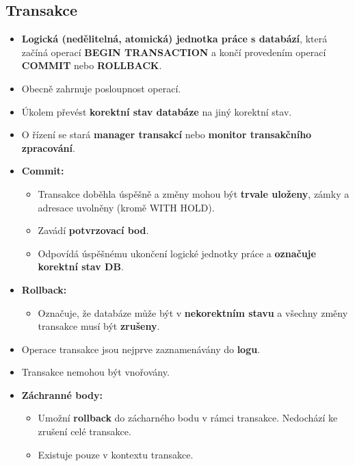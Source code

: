 \subsection{Transakce}
\begin{itemize}
\item \textbf{Logická (nedělitelná, atomická) jednotka práce s databází}, která začíná operací \textbf{BEGIN TRANSACTION} a končí provedením operací \textbf{COMMIT} nebo \textbf{ROLLBACK}.
\item Obecně zahrnuje posloupnost operací.
\item Úkolem převést \textbf{korektní stav databáze} na jiný korektní stav.
\item O řízení se stará \textbf{manager transakcí} nebo \textbf{monitor transakčního zpracování}.
\item \textbf{Commit:}
\begin{itemize}
\item Transakce doběhla úspěšně a změny mohou být \textbf{trvale uloženy}, zámky a adresace uvolněny (kromě WITH HOLD).
\item Zavádí \textbf{potvrzovací bod}.
\item Odpovídá úspěšnému ukončení logické jednotky práce a \textbf{označuje korektní stav DB}.
\end{itemize}
\item \textbf{Rollback:}
\begin{itemize}
\item Označuje, že databáze může být v \textbf{nekorektním stavu} a všechny změny transakce musí být \textbf{zrušeny}.
\end{itemize}
\item Operace transakce jsou nejprve zaznamenávány do\textbf{ logu}.
\item Transakce nemohou být vnořovány.
\item \textbf{Záchranné body:}
\begin{itemize}
\item Umožní \textbf{rollback} do zácharného bodu v rámci transakce. Nedochází ke zrušení celé transakce.
\item Existuje pouze v kontextu transakce.
\end{itemize}
\end{itemize}

